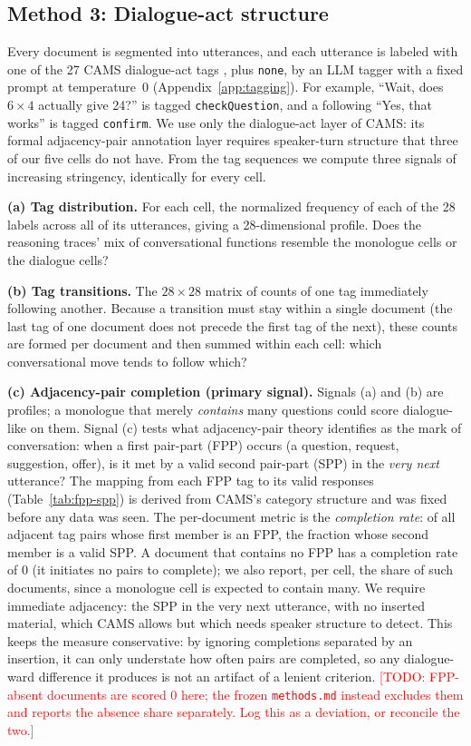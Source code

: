 \documentclass[11pt]{article}
\newcommand{\todo}[1]{\textcolor{red}{[TODO: #1]}}
\begin{document}
\subsection{Method 3: Dialogue-act structure}
\label{sec:method3}

Every document is segmented into utterances, and each utterance is labeled
with one of the 27 CAMS dialogue-act tags \citep{duran2022cams}, plus
\texttt{none}, by an LLM tagger with a fixed prompt at temperature~0
(Appendix~\ref{app:tagging}). For example, ``Wait, does $6\times4$ actually
give 24?'' is tagged \texttt{checkQuestion}, and a following ``Yes, that
works'' is tagged \texttt{confirm}. We use only the dialogue-act layer of
CAMS: its formal adjacency-pair annotation layer requires speaker-turn
structure that three of our five cells do not have. From the tag sequences we
compute three signals of increasing stringency, identically for every cell.

\textbf{(a) Tag distribution.} For each cell, the normalized frequency of each
of the 28 labels across all of its utterances, giving a 28-dimensional profile.
Does the reasoning traces' mix of conversational functions resemble the
monologue cells or the dialogue cells?

\textbf{(b) Tag transitions.} The $28{\times}28$ matrix of counts of one tag
immediately following another. Because a transition must stay within a single
document (the last tag of one document does not precede the first tag of the
next), these counts are formed per document and then summed within each cell:
which conversational move tends to follow which?

\textbf{(c) Adjacency-pair completion (primary signal).} Signals (a) and (b)
are profiles; a monologue that merely \emph{contains} many questions could
score dialogue-like on them. Signal (c) tests what adjacency-pair theory
identifies as the mark of conversation: when a first pair-part (FPP)
occurs (a question, request, suggestion, offer), is it met by a valid second
pair-part (SPP) in the \emph{very next} utterance? The mapping from each FPP
tag to its valid responses (Table~\ref{tab:fpp-spp}) is derived from CAMS's
category structure and was fixed before any data was seen. The per-document
metric is the \emph{completion rate}: of all adjacent tag pairs whose first
member is an FPP, the fraction whose second member is a valid SPP. A document
that contains no FPP has a completion rate of 0 (it initiates no pairs to
complete); we also report, per cell, the share of such documents, since a
monologue cell is expected to contain many. We require immediate
adjacency: the SPP in the very next utterance, with no inserted material,
which CAMS allows but which needs speaker structure to detect. This keeps the
measure conservative: by ignoring completions separated by an insertion, it
can only understate how often pairs are completed, so any dialogue-ward
difference it produces is not an artifact of a lenient criterion.%
\todo{FPP-absent documents are scored 0 here; the frozen \texttt{methods.md}
instead excludes them and reports the absence share separately. Log this as a
deviation, or reconcile the two.}
\end{document}
